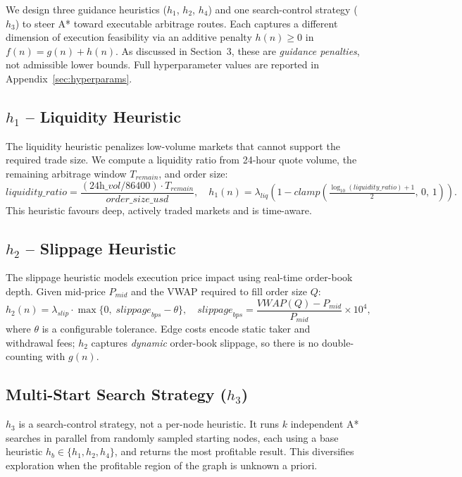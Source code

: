 We design three guidance heuristics ($h_1$, $h_2$, $h_4$) and one search-control strategy ($h_3$) to steer A* toward executable arbitrage routes. Each captures a different dimension of execution feasibility via an additive penalty $h(n) \geq 0$ in $f(n) = g(n) + h(n)$. As discussed in Section~3, these are \emph{guidance penalties}, not admissible lower bounds. Full hyperparameter values are reported in Appendix~\ref{sec:hyperparams}.

\subsection{$h_1$ -- Liquidity Heuristic}

The liquidity heuristic penalizes low-volume markets that cannot support the required trade size. We compute a liquidity ratio from 24-hour quote volume, the remaining arbitrage window $T_{\textit{remain}}$, and order size:
\[
\textit{liquidity\_ratio} = \frac{(\textit{24h\_vol} / 86400) \cdot T_{\textit{remain}}}{\textit{order\_size\_usd}},
\quad
h_1(n) = \lambda_{liq}\!\left(1 - \textit{clamp}\!\left(\tfrac{\log_{10}(\textit{liquidity\_ratio})+1}{2},\,0,\,1\right)\right).
\]
This heuristic favours deep, actively traded markets and is time-aware.

\subsection{$h_2$ -- Slippage Heuristic}

The slippage heuristic models execution price impact using real-time order-book depth. Given mid-price $P_{mid}$ and the VWAP required to fill order size $Q$:
\[
h_2(n) = \lambda_{slip} \cdot \max\!\bigl\{0,\; \textit{slippage}_{bps} - \theta\bigr\},
\quad
\textit{slippage}_{bps} = \frac{\textit{VWAP}(Q) - P_{mid}}{P_{mid}} \times 10^4,
\]
where $\theta$ is a configurable tolerance. Edge costs encode static taker and withdrawal fees; $h_2$ captures \emph{dynamic} order-book slippage, so there is no double-counting with $g(n)$.

\subsection{Multi-Start Search Strategy ($h_3$)}
\label{sec:h3_multistart}

$h_3$ is a search-control strategy, not a per-node heuristic. It runs $k$ independent A* searches in parallel from randomly sampled starting nodes, each using a base heuristic $h_b \in \{h_1, h_2, h_4\}$, and returns the most profitable result. This diversifies exploration when the profitable region of the graph is unknown a priori.

